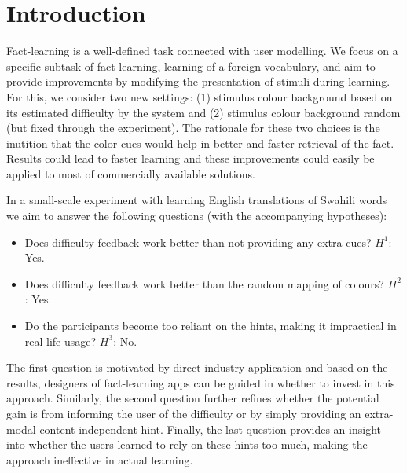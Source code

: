 \section{Introduction}

Fact-learning is a well-defined task connected with user modelling.
We focus on a specific subtask of fact-learning, learning of a foreign vocabulary, and aim to provide improvements by modifying the presentation of stimuli during learning.
For this, we consider two new settings: (1) stimulus colour background based on its estimated difficulty by the system and (2) stimulus colour background random (but fixed through the experiment).
The rationale for these two choices is the inutition that the color cues would help in better and faster retrieval of the fact.
Results could lead to faster learning and these improvements could easily be applied to most of commercially available solutions.


In a small-scale experiment with learning English translations of Swahili words we aim to answer the following questions (with the accompanying hypotheses):

\begin{itemize}[noitemsep]
\item Does difficulty feedback work better than not providing any extra cues? {$H^1$: Yes.}
\item Does difficulty feedback work better than the random mapping of colours? {$H^2$: Yes.}
\item Do the participants become too reliant on the hints, making it impractical in real-life usage? {$H^3$: No.}
\end{itemize}

The first question is motivated by direct industry application and based on the results, designers of fact-learning apps can be guided in whether to invest in this approach.
Similarly, the second question further refines whether the potential gain is from informing the user of the difficulty or by simply providing an extra-modal content-independent hint.
Finally, the last question provides an insight into whether the users learned to rely on these hints too much, making the approach ineffective in actual learning.

